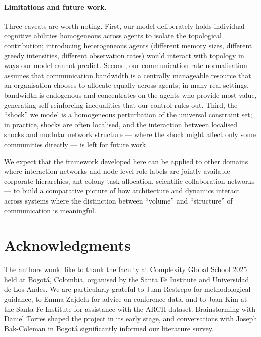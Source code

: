 \documentclass{article}
\begin{document}
\paragraph{Limitations and future work.} Three caveats are worth noting. First, our model deliberately holds individual cognitive abilities homogeneous across agents to isolate the topological contribution; introducing heterogeneous agents (different memory sizes, different greedy intensities, different observation rates) would interact with topology in ways our model cannot predict. Second, our communication-rate normalisation assumes that communication bandwidth is a centrally manageable resource that an organisation chooses to allocate equally across agents; in many real settings, bandwidth is endogenous and concentrates on the agents who provide most value, generating self-reinforcing inequalities that our control rules out. Third, the ``shock'' we model is a homogeneous perturbation of the universal constraint set; in practice, shocks are often localised, and the interaction between localised shocks and modular network structure --- where the shock might affect only some communities directly --- is left for future work.

We expect that the framework developed here can be applied to other domains where interaction networks and node-level role labels are jointly available --- corporate hierarchies, ant-colony task allocation, scientific collaboration networks --- to build a comparative picture of how architecture and dynamics interact across systems where the distinction between ``volume'' and ``structure'' of communication is meaningful.


\section{Acknowledgments}

The authors would like to thank the faculty at Complexity Global School 2025 held at Bogot\'a, Colombia, organised by the Santa Fe Institute and Universidad de Los Andes. We are particularly grateful to Juan Restrepo for methodological guidance, to Emma Zajdela for advice on conference data, and to Joan Kim at the Santa Fe Institute for assistance with the ARCH dataset. Brainstorming with Daniel Torres shaped the project in its early stage, and conversations with Joseph Bak-Coleman in Bogot\'a significantly informed our literature survey.


\printbibliography

\appendix
\end{document}
